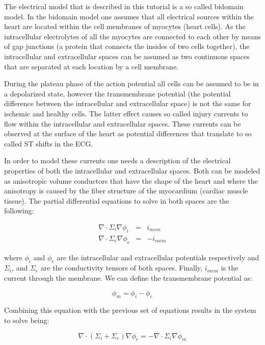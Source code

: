 \documentclass[fleqn,11pt,openany]{book}
\begin{document}
The electrical model that is described in this tutorial is a so called bidomain model. In the bidomain model one assumes that all electrical sources within the heart are located within the cell membranes of myocytes (heart cells). As the intracellular electrolytes of all the myocytes are connected to each other by means of  gap junctions (a protein that connects the insides of two cells together), the intracellular and extracellular spaces can be assumed as two continuous spaces that are separated at each location by a cell membrane. 

During the plateau phase of the action potential all cells can be assumed to be in a depolarized state, however the transmembrane potential (the potential difference between the intracellular and extracellular space) is not the same for ischemic and healthy cells. The latter effect causes so called injury currents to flow within the intracellular and extracellular spaces. These currents can be observed at the surface of the heart as potential differences that translate to so called ST shifts in the ECG.   

In order to model these currents one needs a description of the electrical properties of both the intracellular and extracellular spaces. Both can be modeled as anisotropic volume conductors that have the shape of the heart and where the anisotropy is caused by the fiber structure of the myocardium (cardiac muscle tissue). The partial differential equations to solve in both spaces are the following:

\begin{eqnarray} 
	\nabla \cdot \Sigma_i \nabla \phi_i &=& i_{mem} \\
	\nabla \cdot \Sigma_e \nabla \phi_e &=& -i_{mem}
\end{eqnarray} 

\noindent where $\phi_i$ and $\phi_e$ are the intracellular and extracellular potentials respectively and $\Sigma_i$, and $\Sigma_e$ are the conductivity tensors of both spaces. Finally, $i_{mem}$ is the current through the membrane. We can define the transmembrane potential as:

\begin{equation}
  	\phi_m = \phi_i - \phi_e
\end{equation}

\noindent Combining this equation with the previous set of equations results in the system to solve being:

\begin{equation}\label{eqn:bidomain2}
	\nabla \cdot (\Sigma_i + \Sigma_e ) \nabla \phi_e = -\nabla \cdot \Sigma_i \nabla \phi_m
\end{equation}
\end{document}
